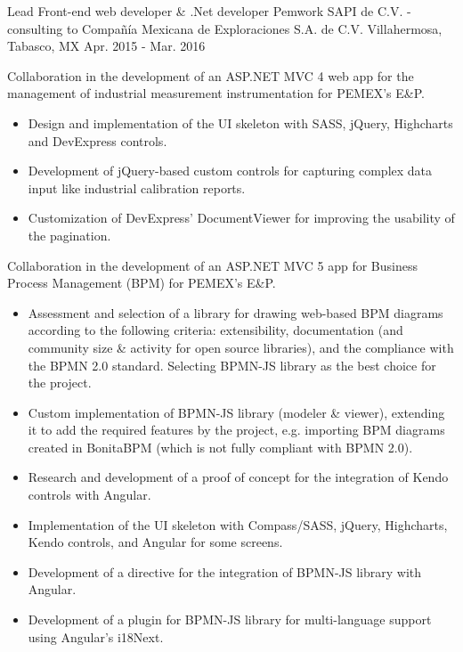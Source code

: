 \begin{cventries}
\cventry
{Lead Front-end web developer \& .Net developer} %
{Pemwork SAPI de C.V. - consulting to Compañía Mexicana de Exploraciones S.A. de C.V.} %
{Villahermosa, Tabasco, MX} %
{Apr. 2015 - Mar. 2016} %
{ %
	\begin{cvitems}
		\item{Collaboration in the development of an ASP.NET MVC 4 web app for the management of industrial measurement instrumentation for PEMEX's E\&P.}
		\begin{itemize}
			\item{Design and implementation of the UI skeleton with SASS, jQuery, Highcharts and DevExpress controls.}
			\item{Development of jQuery-based custom controls for capturing complex data input like industrial calibration reports.}
			\item{Customization of DevExpress' DocumentViewer for improving the usability of the pagination.}
		\end{itemize}		
		\item{Collaboration in the development of an ASP.NET MVC 5 app for Business Process Management (BPM) for PEMEX's E\&P.}
		\begin{itemize}
			\item{Assessment and selection of a library for drawing web-based BPM diagrams according to the following criteria: extensibility, documentation (and community size \& activity for open source libraries), and the compliance with the BPMN 2.0 standard. Selecting BPMN-JS library as the best choice for the project.}
			\item{Custom implementation of BPMN-JS library (modeler \& viewer), extending it to add the required features by the project, e.g. importing BPM diagrams created in BonitaBPM (which is not fully compliant with BPMN 2.0).}
			\item{Research and development of a proof of concept for the integration of Kendo controls with Angular.}
			\item{Implementation of the UI skeleton with Compass/SASS, jQuery, Highcharts, Kendo controls, and Angular for some screens.}
			\item{Development of a directive for the integration of BPMN-JS library with Angular.}
			\item{Development of a plugin for BPMN-JS library for multi-language support using Angular's i18Next.}
		\end{itemize}
	\end{cvitems}
}


\end{cventries}
